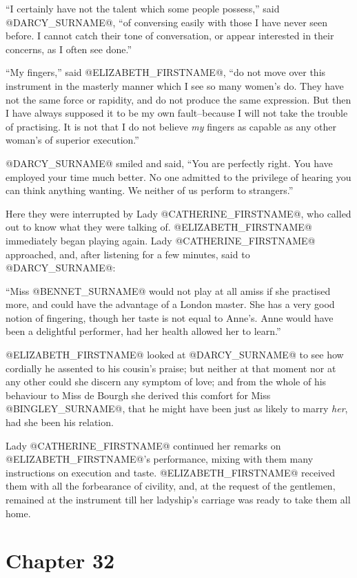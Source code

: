 ``I certainly have not the talent which some people possess,'' said @DARCY_SURNAME@,
``of conversing easily with those I have never seen before. I cannot
catch their tone of conversation, or appear interested in their
concerns, as I often see done.''

``My fingers,'' said @ELIZABETH_FIRSTNAME@, ``do not move over this instrument in the
masterly manner which I see so many women's do. They have not the same
force or rapidity, and do not produce the same expression. But then I
have always supposed it to be my own fault--because I will not take the
trouble of practising. It is not that I do not believe \textit{my} fingers as
capable as any other woman's of superior execution.''

@DARCY_SURNAME@ smiled and said, ``You are perfectly right. You have employed your
time much better. No one admitted to the privilege of hearing you can
think anything wanting. We neither of us perform to strangers.''

Here they were interrupted by Lady @CATHERINE_FIRSTNAME@, who called out to know
what they were talking of. @ELIZABETH_FIRSTNAME@ immediately began playing again.
Lady @CATHERINE_FIRSTNAME@ approached, and, after listening for a few minutes, said
to @DARCY_SURNAME@:

``Miss @BENNET_SURNAME@ would not play at all amiss if she practised more, and
could have the advantage of a London master. She has a very good notion
of fingering, though her taste is not equal to Anne's. Anne would have
been a delightful performer, had her health allowed her to learn.''

@ELIZABETH_FIRSTNAME@ looked at @DARCY_SURNAME@ to see how cordially he assented to his
cousin's praise; but neither at that moment nor at any other could she
discern any symptom of love; and from the whole of his behaviour to Miss
de Bourgh she derived this comfort for Miss @BINGLEY_SURNAME@, that he might have
been just as likely to marry \textit{her}, had she been his relation.

Lady @CATHERINE_FIRSTNAME@ continued her remarks on @ELIZABETH_FIRSTNAME@'s performance, mixing
with them many instructions on execution and taste. @ELIZABETH_FIRSTNAME@ received
them with all the forbearance of civility, and, at the request of the
gentlemen, remained at the instrument till her ladyship's carriage was
ready to take them all home.



\chapter*{Chapter 32}


